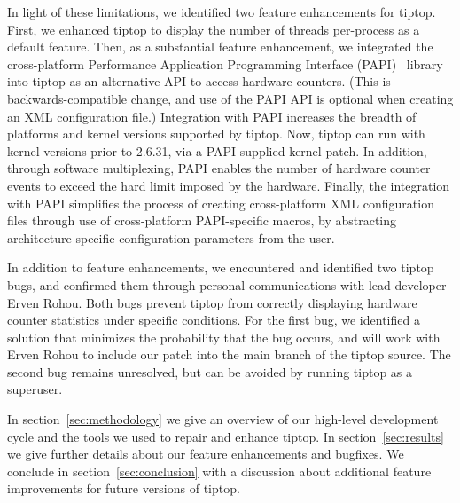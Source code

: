 In light of these limitations, we identified two feature enhancements for tiptop.
First, we enhanced tiptop to display the number of threads per-process as a default feature.
Then, as a substantial feature enhancement, we integrated the cross-platform Performance Application Programming Interface (PAPI)~\cite{Mucci99papi:a} library into tiptop as an alternative API to access hardware counters. (This is backwards-compatible change, and use of the PAPI API is optional when creating an XML configuration file.)
Integration with PAPI increases the breadth of platforms and kernel versions supported by tiptop.
Now, tiptop can run with kernel versions prior to 2.6.31, via a PAPI-supplied kernel patch.
In addition, through software multiplexing, PAPI enables the number of hardware counter events to exceed the hard limit imposed by the hardware.
Finally, the integration with PAPI simplifies the process of creating cross-platform XML configuration files through use of cross-platform PAPI-specific macros, by abstracting architecture-specific configuration parameters from the user.

In addition to feature enhancements, we encountered and identified two tiptop bugs, and confirmed them through personal communications with lead developer Erven Rohou.
Both bugs prevent tiptop from correctly displaying hardware counter statistics under specific conditions.
For the first bug, we identified a solution that minimizes the probability that the bug occurs, and will work with Erven Rohou to include our patch into the main branch of the tiptop source.
The second bug remains unresolved, but can be avoided by running tiptop as a superuser.

In section~\ref{sec:methodology} we give an overview of our high-level development cycle and the tools we used to repair and enhance tiptop.
In section~\ref{sec:results} we give further details about our feature enhancements and bugfixes.
We conclude in section~\ref{sec:conclusion} with a discussion about additional feature improvements for future versions of tiptop.

